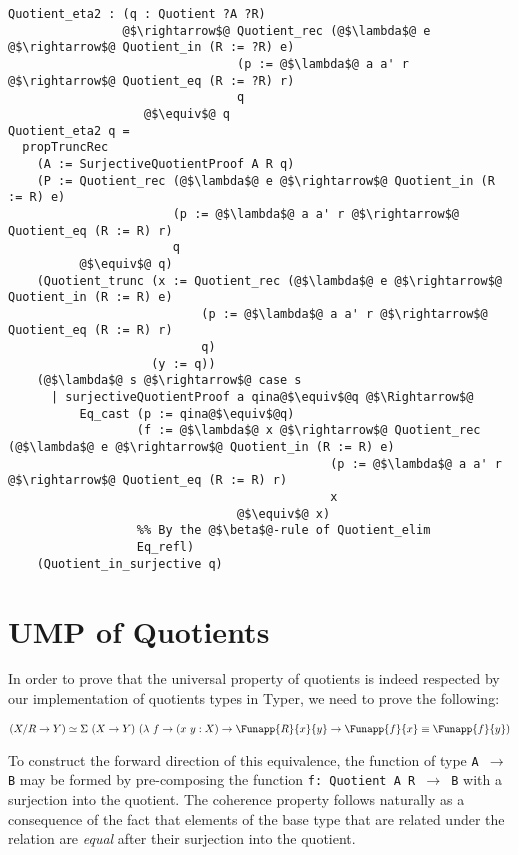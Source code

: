 \documentclass[12pt,twoside,maitrise]{dms}
\theoremstyle{definition}
\numberwithin{equation}{section}
\numberwithin{table}{chapter}
\numberwithin{figure}{chapter}
\newcommand\fn[1] {\texttt{#1}}
\begin{document}
\begin{verbatim}
Quotient_eta2 : (q : Quotient ?A ?R)
                @$\rightarrow$@ Quotient_rec (@$\lambda$@ e @$\rightarrow$@ Quotient_in (R := ?R) e)
                                (p := @$\lambda$@ a a' r @$\rightarrow$@ Quotient_eq (R := ?R) r)
                                q
                   @$\equiv$@ q
Quotient_eta2 q =
  propTruncRec
    (A := SurjectiveQuotientProof A R q)
    (P := Quotient_rec (@$\lambda$@ e @$\rightarrow$@ Quotient_in (R := R) e)
                       (p := @$\lambda$@ a a' r @$\rightarrow$@ Quotient_eq (R := R) r)
                       q
          @$\equiv$@ q)
    (Quotient_trunc (x := Quotient_rec (@$\lambda$@ e @$\rightarrow$@ Quotient_in (R := R) e)
                           (p := @$\lambda$@ a a' r @$\rightarrow$@ Quotient_eq (R := R) r)
                           q)
                    (y := q))
    (@$\lambda$@ s @$\rightarrow$@ case s
      | surjectiveQuotientProof a qina@$\equiv$@q @$\Rightarrow$@
          Eq_cast (p := qina@$\equiv$@q)
                  (f := @$\lambda$@ x @$\rightarrow$@ Quotient_rec (@$\lambda$@ e @$\rightarrow$@ Quotient_in (R := R) e)
                                             (p := @$\lambda$@ a a' r @$\rightarrow$@ Quotient_eq (R := R) r)
                                             x
                                @$\equiv$@ x)
                  %% By the @$\beta$@-rule of Quotient_elim
                  Eq_refl)
    (Quotient_in_surjective q)
\end{verbatim}

\section{UMP of Quotients}\label{app:ump-quot}

In order to prove that the universal property of quotients is indeed respected by our
implementation of quotients types in Typer, we need to prove the following:

\begin{align*}
  & (X/R \rightarrow Y) \simeq \Sigma \ (X \rightarrow Y) \ (\lambda \ f \rightarrow (x \ y : X) \rightarrow \Funapp{R}{x}{y} \rightarrow \Funapp{f}{x} \equiv \Funapp{f}{y}) \\
\end{align*}

To construct the forward direction of this equivalence, the function of type
\fn{A $\rightarrow$ B} may be formed by pre-composing the function \fn{f:
  Quotient A R $\rightarrow$ B} with a surjection into the quotient. The
coherence property follows naturally as a consequence of the fact that elements
of the base type that are related under the relation are \emph{equal} after
their surjection into the quotient.
\end{document}
